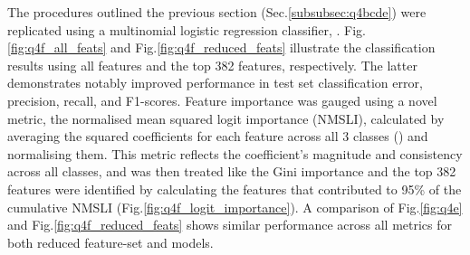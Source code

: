     The procedures outlined the previous section (Sec.\eqref{subsubsec:q4bcde}) were replicated using a multinomial logistic regression
    classifier, .
    Fig.\eqref{fig:q4f_all_feats} and Fig.\eqref{fig:q4f_reduced_feats} illustrate the classification results using all
    features and the top 382 features, respectively.
    The latter demonstrates notably improved performance in test set classification error, precision, recall, and F1-scores.
    Feature importance was gauged using a novel metric, the normalised mean squared logit importance (NMSLI), calculated
    by averaging the squared coefficients for each feature across all 3 classes () and
    normalising them.
    This metric reflects the coefficient's magnitude and consistency across all classes, and was then treated like the
    Gini importance and the top 382 features were identified by calculating the features that contributed to 95\% of the
    cumulative NMSLI (Fig.\eqref{fig:q4f_logit_importance}).
    A comparison of Fig.\eqref{fig:q4e} and Fig.\eqref{fig:q4f_reduced_feats} shows similar performance across all
    metrics for both reduced feature-set  and  models.
